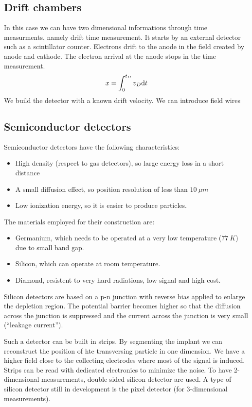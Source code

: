 \documentclass[../../main/main.tex]{subfiles}
\begin{document}
\subsection{Drift chambers}
In this case we can have two dimensional informations through time measurments, namely drift time measurement. It starts by an external detector such as a scintillator counter. Electrons drift to the anode in the field created by anode and cathode. The electron arrival at the anode stops in the time measurement.
\begin{equation}
    x
    =
    \int_{0}^{t_D} v_D \mathrm{d}{t}
    \label{eq:}
\end{equation}
We build the detector with a known drift velocity. We can introduce field wires



\subsection{Semiconductor detectors}
Semiconductor detectors have the following characteristics:
\begin{itemize}
    \item High density (respect to gas detectors), so large energy loss in a short distance
    \item A small diffusion effect, so position resolution of less than \( 10 \ \si{\mu m} \)
    \item Low ionization energy, so it is easier to produce particles.
\end{itemize}

The materials employed for their construction are:
\begin{itemize}
    \item Germanium, which needs to be operated at a very low temperature (\( 77 \ \si{K} \)) due to small band gap.
    \item Silicon, which can operate at room temperature.
    \item Diamond, resistent to very hard radiations, low signal and high cost.
\end{itemize}

Silicon detectors are based on a p-n junction with reverse bias applied to enlarge the depletion region. The potential barrier becomes higher so that the diffusion across the junction is suppressed and the current across the junction is very small (``leakage current'').

Such a detector can be built in strips. By segmenting the implant we can reconstruct the position of hte transversing particle in one dimension. We have a higher field close to the collecting electrodes where most of the signal is induced. Strips can be read with dedicated electronics to minimize the noise. To have 2-dimensional measurements, double sided silicon detector are used. A type of silicon detector still in development is the pixel detector (for 3-dimensional measurements).
\end{document}
